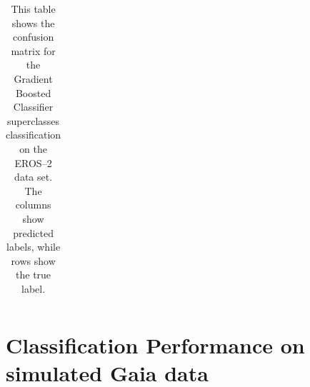 \begin{table}[h]
{\begin{tabular}{c|ccccccccc|c}
\end{tabular}
}
\label{tab:gb-confusion-matrix-superclasses}
\caption{This table shows the confusion matrix for the Gradient Boosted Classifier superclasses classification on the EROS--2 data set. The columns show predicted labels, while rows show the true label.}
\end{table}

\chapter{Classification Performance on simulated Gaia data}

